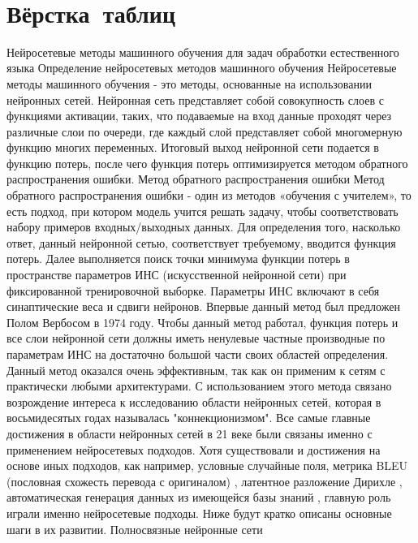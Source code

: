   \chapter{Вёрстка таблиц}\label{ch:ch3} 
  
Нейросетевые методы машинного обучения для задач обработки естественного языка
Определение нейросетевых методов машинного обучения
Нейросетевые методы машинного обучения - это методы, основанные на использовании нейронных сетей. Нейронная сеть представляет собой совокупность слоев с функциями активации, таких, что подаваемые на вход данные проходят через различные слои по очереди, где каждый слой представляет собой многомерную функцию многих переменных. Итоговый выход нейронной сети подается в функцию потерь, после чего функция потерь оптимизируется методом обратного распространения ошибки. 
Метод обратного распространения ошибки
Метод обратного распространения ошибки - один из методов «обучения с учителем», то есть подход, при котором модель учится решать задачу, чтобы соответствовать набору примеров входных/выходных данных. Для определения того, насколько ответ, данный нейронной сетью, соответствует требуемому, вводится функция потерь. Далее выполняется поиск точки минимума функции потерь в пространстве параметров ИНС (искусственной нейронной сети) при фиксированной тренировочной выборке. Параметры ИНС включают в себя синаптические веса и сдвиги нейронов. Впервые данный метод был предложен Полом Вербосом в 1974 году\cite{Werbos_1974}. Чтобы данный метод работал, функция потерь и все слои нейронной сети должны иметь ненулевые частные производные по параметрам ИНС на достаточно большой части своих областей определения.
Данный метод оказался очень эффективным, так как он применим к сетям с практически любыми архитектурами. С использованием этого метода связано возрождение интереса к исследованию области нейронных сетей, которая в восьмидесятых годах называлась "коннекционизмом". 
Все самые главные достижения в области нейронных сетей в 21 веке были связаны именно с применением нейросетевых подходов. Хотя существовали и достижения на основе иных подходов, как например, условные случайные поля\cite{Lafferty_Zhu_Liu_2004}, метрика BLEU (пословная схожесть перевода с оригиналом) \cite{Papineni_Roukos_Ward_Zhu_2001}, латентное разложение Дирихле \cite{Blei_Ng_Jordan_2003}, автоматическая генерация данных из имеющейся базы знаний \cite{Distant supervision for relation extraction without labeled data - ACL Anthology}, главную роль играли именно нейросетевые подходы. Ниже будут кратко описаны основные шаги в их развитии.
Полносвязные нейронные сети
